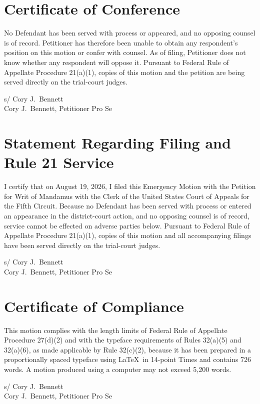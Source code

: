 \documentclass[14pt]{extarticle}
\renewcommand{\FilingDate}{August 19, 2026}
\newcommand{\EmergencyWordCount}{726}
\begin{document}
\clearpage
\section*{Certificate of Conference}

No Defendant has been served with process or appeared, and no opposing counsel is of record. Petitioner has therefore been unable to obtain any respondent's position on this motion or confer with counsel. As of filing, Petitioner does not know whether any respondent will oppose it. Pursuant to Federal Rule of Appellate Procedure 21(a)(1), copies of this motion and the petition are being served directly on the trial-court judges.

\vspace{0.8em}
\noindent s/ Cory J.\ Bennett\\
Cory J.\ Bennett, Petitioner Pro Se

\vspace{1.2em}
\section*{Statement Regarding Filing and Rule 21 Service}

I certify that on \FilingDate, I filed this Emergency Motion with the Petition for Writ of Mandamus with the Clerk of the United States Court of Appeals for the Fifth Circuit. Because no Defendant has been served with process or entered an appearance in the district-court action, and no opposing counsel is of record, service cannot be effected on adverse parties below. Pursuant to Federal Rule of Appellate Procedure 21(a)(1), copies of this motion and all accompanying filings have been served directly on the trial-court judges.

\vspace{0.8em}
\noindent s/ Cory J.\ Bennett\\
Cory J.\ Bennett, Petitioner Pro Se

\vspace{1.2em}
\section*{Certificate of Compliance}

This motion complies with the length limits of Federal Rule of Appellate Procedure 27(d)(2) and with the typeface requirements of Rules 32(a)(5) and 32(a)(6), as made applicable by Rule 32(c)(2), because it has been prepared in a proportionally spaced typeface using \LaTeX\ in 14-point Times and contains \EmergencyWordCount{} words. A motion produced using a computer may not exceed 5,200 words.

\vspace{0.8em}
\noindent s/ Cory J.\ Bennett\\
Cory J.\ Bennett, Petitioner Pro Se
\end{document}
